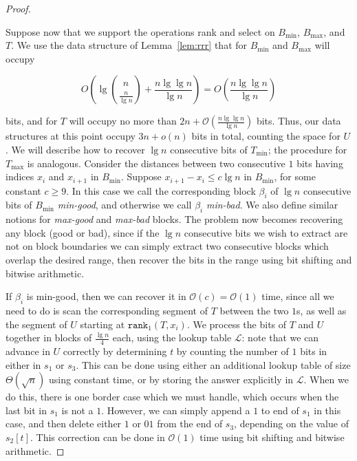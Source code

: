 \documentclass[runningheads]{llncs}
\newcommand{\Oh}{\mathcal{O}}
\begin{document}
\begin{proof}
\begin{enumerate}
\end{enumerate}

Suppose now that we support the operations rank and select on
$B_{\min}$, $B_{\max}$, and $T$.  We use the data structure of
Lemma~\ref{lem:rrr} that for $B_{\min}$ and $B_{\max}$ will occupy

$$O\left(\lg \binom{n}{\frac{n}{ \lg n}} + \frac{n \lg \lg n}{\lg n}\right) = O\left(\frac{n \lg \lg n}{\lg n}\right)$$ 

\noindent
bits, and for $T$ will occupy no more than $2n + \Oh(\frac{n\lg\lg n
}{\lg n})$ bits.  Thus, our data structures at this point occupy
$3n+o(n)$ bits in total, counting the space for $U$.  We will describe
how to recover $\lg n$ consecutive bits of $T_{\min}$; the procedure
for $T_{\max}$ is analogous.  Consider the distances between two
consecutive $1$ bits having indices $x_i$ and $x_{i+1}$ in $B_{\min}$.
Suppose $x_{i+1} - x_{i} \le c \lg n$ in $B_{\min}$, for some constant
$c \ge 9$.  In this case we call the corresponding block $\beta_i$ of
$\lg n$ consecutive bits of $B_{\min}$ \emph{min-good}, and otherwise
we call $\beta_i$ \emph{min-bad}.  We also define similar notions for
\emph{max-good} and \emph{max-bad} blocks.  The problem now becomes
recovering any block (good or bad), since if the $\lg n$ consecutive
bits we wish to extract are not on block boundaries we can simply
extract two consecutive blocks which overlap the desired range, then
recover the bits in the range using bit shifting and bitwise
arithmetic.

If $\beta_i$ is min-good, then we can recover it in $\Oh(c) = \Oh(1)$
time, since all we need to do is scan the corresponding segment of $T$
between the two $1$s, as well as the segment of $U$ starting at
$\texttt{rank}_1(T,x_i)$.  We process the bits of $T$ and $U$ together
in blocks of $\frac{\lg n}{4}$ each, using the lookup table
$\mathcal{L}$: note that we can advance in $U$ correctly by
determining $t$ by counting the number of $1$ bits in either in $s_1$
or $s_3$.  This can be done using either an additional lookup table of
size $\Theta(\sqrt{n})$ using constant time, or by storing the answer
explicitly in $\mathcal{L}$.  When we do this, there is one border
case which we must handle, which occurs when the last bit in $s_1$ is
not a $1$.  However, we can simply append a $1$ to end of $s_1$ in
this case, and then delete either $1$ or $01$ from the end of $s_3$,
depending on the value of $s_2[t]$.  This correction can be done in
$\Oh(1)$ time using bit shifting and bitwise arithmetic.


\end{proof}
\end{document}

